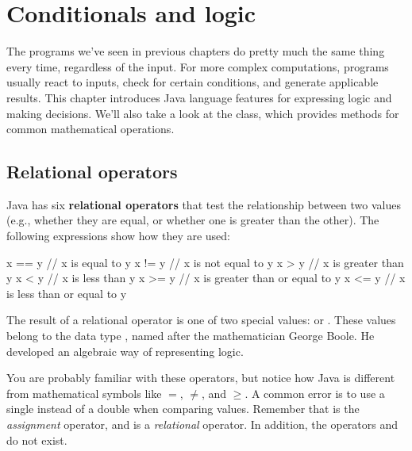 \chapter{Conditionals and logic}


The programs we've seen in previous chapters do pretty much the same thing every time, regardless of the input.
For more complex computations, programs usually react to inputs, check for certain conditions, and generate applicable results.
This chapter introduces Java language features for expressing logic and making decisions.
We'll also take a look at the  class, which provides methods for common mathematical operations.


\section{Relational operators}


Java has six {\bf relational operators} that test the relationship between two values (e.g., whether they are equal, or whether one is greater than the other).
The following expressions show how they are used:

\begin{code}
x == y          // x is equal to y
x != y          // x is not equal to y
x > y           // x is greater than y
x < y           // x is less than y
x >= y          // x is greater than or equal to y
x <= y          // x is less than or equal to y
\end{code}


The result of a relational operator is one of two special values:  or .
These values belong to the data type , named after the mathematician George Boole.
He developed an algebraic way of representing logic.


You are probably familiar with these operators, but notice how Java is different from mathematical symbols like $=$, $\neq$, and $\geq$.
A common error is to use a single \java{=} instead of a double \java{==} when comparing values.
Remember that \java{=} is the {\em assignment} operator, and \java{==} is a {\em relational} operator.
In addition, the operators \java{=<} and \java{=>} do not exist.

